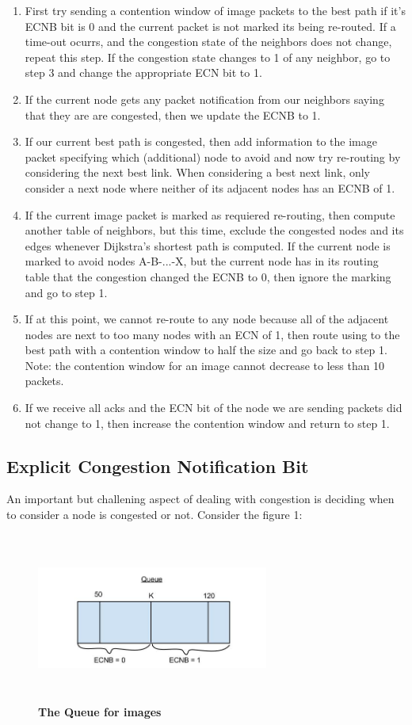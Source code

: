 \documentclass[letterpaper]{article}
\begin{document}
\begin{enumerate}

  \item First try sending a contention window of image packets to the best path if it's ECNB bit is 0 and the current packet is not marked its being re-routed. If a time-out ocurrs, and the congestion state of the neighbors does not change, repeat this step. If the congestion state changes to 1 of any neighbor, go to step 3 and change the appropriate ECN bit to 1.
  \item If the current node gets any packet notification from our neighbors saying that they are are congested, then we update the ECNB to 1.
  \item If our current best path is congested, then add information to the image packet specifying which (additional) node to avoid and now try re-routing by considering the next best link. When considering a best next link, only consider a next node where neither of its adjacent nodes has an ECNB of 1. 
  \item If the current image packet is marked as requiered re-routing, then compute another table of neighbors, but this time, exclude the congested nodes and its edges whenever Dijkstra's shortest path is computed. If the current node is marked to avoid nodes A-B-...-X, but the current node has in its routing table that the congestion changed the ECNB to 0, then ignore the marking and go to step 1.
  \item If at this point, we cannot re-route to any node because all of the adjacent nodes are next to too many nodes with an ECN of 1, then route using to the best path with a contention window to half the size and go back to step 1. Note: the contention window for an image cannot decrease to less than 10 packets.
  \item If we receive all acks and the ECN bit of the node we are sending packets did not change to 1, then increase the contention window and return to step 1.
\end{enumerate}

\subsection{Explicit Congestion Notification Bit}

An important but challening aspect of dealing with congestion is deciding when to consider a node is congested or not. Consider the figure 1: 
 
\begin{figure}[ht!]
\centering
\includegraphics[width=3in, height=2.2in]{Queue4.jpg}
\caption{\textbf{The Queue for images}}
\end{figure}
\end{document}
